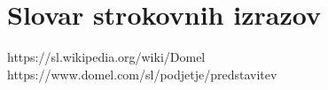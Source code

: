 \documentclass[12pt,a4paper]{amsart}
\theoremstyle{definition} %
\theoremstyle{plain} %
\newcommand{\geslo}[2]{\noindent\textbf{#1}\hspace*{3mm}\hangindent=\parindent\hangafter=1 #2}
\begin{document}
\section*{Slovar strokovnih izrazov}

%
%


\begin{thebibliography}{99}
https://sl.wikipedia.org/wiki/Domel
https://www.domel.com/sl/podjetje/predstavitev



\end{thebibliography}
\end{document}
